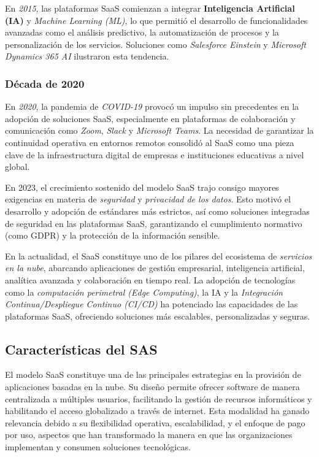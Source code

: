 {                En \textit{2015}, las plataformas SaaS comienzan a integrar \textbf{Inteligencia Artificial (IA)} y \textit{Machine Learning (ML)}, lo que permitió el desarrollo de funcionalidades avanzadas como el análisis predictivo, la automatización de procesos y la personalización de los servicios. Soluciones como \textit{Salesforce Einstein} y \textit{Microsoft Dynamics 365 AI} ilustraron esta tendencia.
                
            \subsubsection{Década de 2020}
                En \textit{2020}, la pandemia de \textit{COVID-19} provocó un impulso sin precedentes en la adopción de soluciones SaaS, especialmente en plataformas de colaboración y comunicación como \textit{Zoom}, \textit{Slack} y \textit{Microsoft Teams}. La necesidad de garantizar la continuidad operativa en entornos remotos consolidó al SaaS como una pieza clave de la infraestructura digital de empresas e instituciones educativas a nivel global.
                
                En 2023, el crecimiento sostenido del modelo SaaS trajo consigo mayores exigencias en materia de \textit{seguridad} y \textit{privacidad de los datos}. Esto motivó el desarrollo y adopción de estándares más estrictos, así como soluciones integradas de seguridad en las plataformas SaaS, garantizando el cumplimiento normativo (como GDPR) y la protección de la información sensible.
                
                En la actualidad, el SaaS constituye uno de los pilares del ecosistema de \textit{servicios en la nube}, abarcando aplicaciones de gestión empresarial, inteligencia artificial, analítica avanzada y colaboración en tiempo real. La adopción de tecnologías como la \textit{computación perimetral (Edge Computing)}, la IA y la \textit{Integración Continua/Despliegue Continuo (CI/CD)} ha potenciado las capacidades de las plataformas SaaS, ofreciendo soluciones más escalables, personalizadas y seguras.

        \subsection{Características del SAS}
            El modelo SaaS constituye una de las principales estrategias en la provisión de aplicaciones basadas en la nube. Su diseño permite ofrecer software de manera centralizada a múltiples usuarios, facilitando la gestión de recursos informáticos y habilitando el acceso globalizado a través de internet. Esta modalidad ha ganado relevancia debido a su flexibilidad operativa, escalabilidad, y el enfoque de pago por uso, aspectos que han transformado la manera en que las organizaciones implementan y consumen soluciones tecnológicas.
            
}
